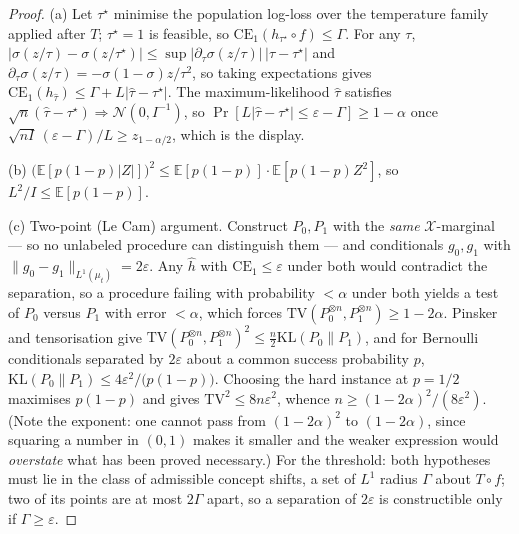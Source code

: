 \begin{proof}
(a) Let $\tau^\star$ minimise the population log-loss over the temperature
family applied after $T$; $\tau^\star=1$ is feasible, so
$\mathrm{CE}_1(h_{\tau^\star}\circ f)\le\Gamma$.  For any $\tau$,
$|\sigma(z/\tau)-\sigma(z/\tau^\star)|\le \sup |\partial_\tau \sigma(z/\tau)|\,
|\tau-\tau^\star|$ and
$\partial_\tau\sigma(z/\tau)=-\sigma(1-\sigma)z/\tau^2$, so taking expectations
gives $\mathrm{CE}_1(h_{\hat\tau})\le\Gamma+L|\hat\tau-\tau^\star|$.  The
maximum-likelihood $\hat\tau$ satisfies
$\sqrt{n}(\hat\tau-\tau^\star)\Rightarrow\mathcal{N}(0,I^{-1})$, so
$\Pr[L|\hat\tau-\tau^\star|\le\varepsilon-\Gamma]\ge1-\alpha$ once
$\sqrt{nI}\,(\varepsilon-\Gamma)/L\ge z_{1-\alpha/2}$, which is the display.

(b) $\big(\mathbb{E}[p(1-p)|Z|]\big)^2\le\mathbb{E}[p(1-p)]\cdot\mathbb{E}[p(1-p)Z^2]$,
so $L^2/I\le\mathbb{E}[p(1-p)]$.

(c) Two-point (Le Cam) argument.  Construct $P_0,P_1$ with the \emph{same}
$\mathcal{X}$-marginal --- so no unlabeled procedure can distinguish them ---
and conditionals $g_0,g_1$ with $\|g_0-g_1\|_{L^1(\mu_t)}=2\varepsilon$.  Any
$\hat h$ with $\mathrm{CE}_1\le\varepsilon$ under both would contradict the
separation, so a procedure failing with probability $<\alpha$ under both yields
a test of $P_0$ versus $P_1$ with error $<\alpha$, which forces
$\mathrm{TV}(P_0^{\otimes n},P_1^{\otimes n})\ge1-2\alpha$.  Pinsker and
tensorisation give
$\mathrm{TV}(P_0^{\otimes n},P_1^{\otimes n})^2\le \tfrac{n}{2}\mathrm{KL}(P_0\|P_1)$,
and for Bernoulli conditionals separated by $2\varepsilon$ about a common
success probability $p$,
$\mathrm{KL}(P_0\|P_1)\le 4\varepsilon^{2}/\big(p(1-p)\big)$.  Choosing the hard
instance at $p=1/2$ maximises $p(1-p)$ and gives
$\mathrm{TV}^2 \le 8n\varepsilon^{2}$, whence
$n\ge(1-2\alpha)^{2}/(8\varepsilon^{2})$.  (Note the exponent: one cannot pass
from $(1-2\alpha)^{2}$ to $(1-2\alpha)$, since squaring a number in $(0,1)$
makes it smaller and the weaker expression would \emph{overstate} what has been
proved necessary.)  For the threshold: both hypotheses must lie in the class of
admissible concept shifts, a set of $L^1$ radius $\Gamma$ about $T\circ f$; two
of its points are at most $2\Gamma$ apart, so a separation of $2\varepsilon$ is
constructible only if $\Gamma\ge\varepsilon$.
\end{proof}

